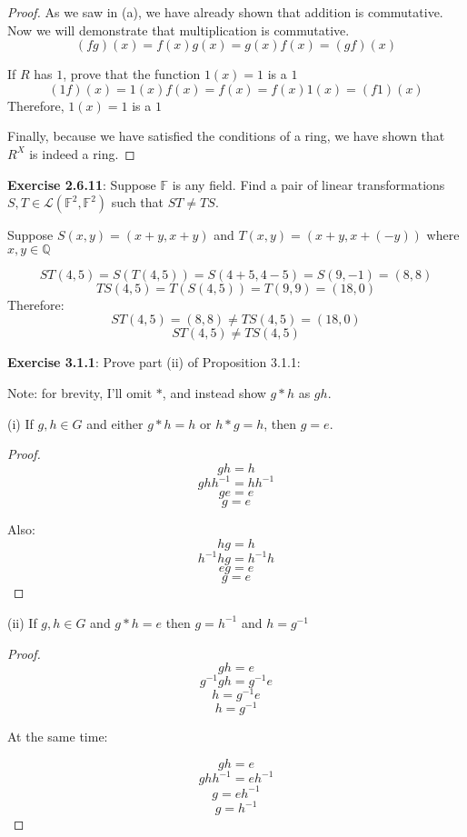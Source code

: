 \documentclass[a4paper]{article}
\begin{document}
\begin{myparindent}{0pt}
\begin{proof}
  As we saw in (a), we have already shown that addition is commutative. Now
  we will demonstrate that multiplication is commutative.
  \[ (fg)(x) = f(x) g(x) = g(x) f(x) = (gf)(x) \] \newline

If $R$ has $1$, prove that the function $1(x) = 1$ is a $1$ \newline
  \[ (1f)(x) = 1(x) f(x) = f(x) = f(x) 1(x) = (f1)(x) \]
  Therefore, $1(x) = 1$ is a $1$ \newline

  Finally, because we have satisfied the conditions of a ring, we have shown
  that $R^X$ is indeed a ring.
\end{proof}

\textbf{Exercise 2.6.11}:
Suppose $\mathbb{F}$ is any field. Find a pair of linear transformations
$S, T \in \mathcal{L}(\mathbb{F}^2, \mathbb{F}^2)$ such that $ST \neq TS$.
\newline

Suppose $S(x, y) = (x + y, x + y)$ and $T(x, y) = (x + y, x + (-y))$
where $x, y \in \mathbb{Q}$

\[ ST(4, 5) = S(T(4, 5)) = S(4 + 5, 4 - 5) = S(9, -1) = (8, 8) \]
\[ TS(4, 5) = T(S(4, 5)) = T(9, 9) = (18, 0) \]
Therefore:
\[ ST(4, 5) = (8, 8) \neq TS(4, 5) = (18, 0) \]
\[ ST(4, 5) \neq TS(4, 5) \]

\textbf{Exercise 3.1.1}:
Prove part (ii) of Proposition 3.1.1: \newline

Note: for brevity, I'll omit $*$, and instead show $g * h$ as $gh$.

(i) If $g, h \in G$ and either $g * h = h$ or $h * g = h$, then $g = e$.
\begin{proof}
  \[ gh = h \]
  \[ ghh^{-1} = hh^{-1} \]
  \[ ge = e \]
  \[ g = e \]

  Also:
  \[ hg = h \]
  \[ h^{-1}hg = h^{-1}h \]
  \[ eg = e \]
  \[ g = e \]

\end{proof}

(ii) If $g, h \in G$ and $g * h = e$ then $g = h^{-1}$ and $h = g^{-1}$
\begin{proof}
  \[ gh = e \]
  \[ g^{-1}gh = g^{-1}e \]
  \[ h = g^{-1}e \]
  \[ h = g^{-1} \]

  At the same time:

  \[ gh = e \]
  \[ ghh^{-1} = eh^{-1} \]
  \[ g = eh^{-1} \]
  \[ g = h^{-1} \]
\end{proof}


\end{myparindent}
\end{document}
